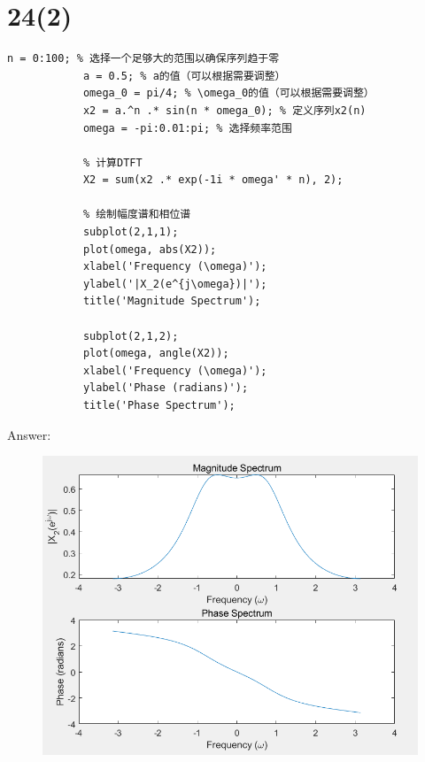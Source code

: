 \documentclass{article}
\begin{document}
    \section*{24(2)}
        \begin{lstlisting}[caption={题24(2) MATLAB代码}, label={lst:matlab}]
            n = 0:100; % 选择一个足够大的范围以确保序列趋于零
            a = 0.5; % a的值（可以根据需要调整）
            omega_0 = pi/4; % \omega_0的值（可以根据需要调整）
            x2 = a.^n .* sin(n * omega_0); % 定义序列x2(n)
            omega = -pi:0.01:pi; % 选择频率范围

            % 计算DTFT
            X2 = sum(x2 .* exp(-1i * omega' * n), 2);

            % 绘制幅度谱和相位谱
            subplot(2,1,1);
            plot(omega, abs(X2));
            xlabel('Frequency (\omega)');
            ylabel('|X_2(e^{j\omega})|');
            title('Magnitude Spectrum');

            subplot(2,1,2);
            plot(omega, angle(X2));
            xlabel('Frequency (\omega)');
            ylabel('Phase (radians)');
            title('Phase Spectrum');

        \end{lstlisting}
        Answer: 
            \begin{figure}[h]
                \includegraphics{24_2.png}
            \end{figure}
            \FloatBarrier
\end{document}
